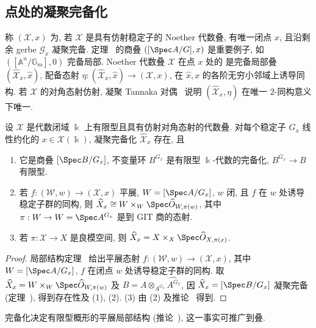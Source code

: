 \subsection{点处的凝聚完备化}\label{src:7.7.6-subsection}
称 $(\mathcal X,x)$ 为, 若 $\mathcal X$ 是具有仿射稳定子的 Noether 代数叠, 有唯一闭点 $x$, 且沿剩余 gerbe $\mathcal G_x$ 凝聚完备. 定理~ 的商叠 $([\Spec A/G],x)$ 是重要例子, 如 $([\mathbb A^n/\mathbb G_m],0)$ 完备局部. Noether 代数叠 $\mathcal X$ 在点 $x$ 处的 是完备局部叠 $(\widehat{\mathcal X}_x,\widehat x)$, 配备态射 $\eta:(\widehat{\mathcal X}_x,\widehat x)\to(\mathcal X,x)$, 在 $\widehat x,x$ 的各阶无穷小邻域上诱导同构. 若 $\mathcal X$ 的对角态射仿射, 凝聚 Tannaka 对偶~ 说明 $(\widehat{\mathcal X}_x,\eta)$ 在唯一 $2$-同构意义下唯一.
\begin{theorem}\label{src:7.7.22}
设 $\mathcal X$ 是代数闭域 $\Bbbk$ 上有限型且具有仿射对角态射的代数叠. 对每个稳定子 $G_x$ 线性约化的 $x\in\mathcal X(\Bbbk)$, 凝聚完备化 $\widehat{\mathcal X}_x$ 存在, 且
\begin{enumerate}[(1)]
\item 它是商叠 $[\Spec B/G_x]$, 不变量环 $B^{G_x}$ 是有限型 $\Bbbk$-代数的完备化, $B^{G_x}\to B$ 有限型.
\item 若 $f:(\mathcal W,w)\to(\mathcal X,x)$ 平展, $\mathcal W=[\Spec A/G_x]$, $w$ 闭, 且 $f$ 在 $w$ 处诱导稳定子群的同构, 则 $\widehat{\mathcal X}_x\cong\mathcal W\times_W\Spec\widehat{\mathcal O}_{W,\pi(w)}$, 其中 $\pi:\mathcal W\to W=\Spec A^{G_x}$ 是到 GIT 商的态射.
\item 若 $\pi:\mathcal X\to X$ 是良模空间, 则 $\widehat{\mathcal X}_x=\mathcal X\times_X\Spec\widehat{\mathcal O}_{X,\pi(x)}$.
\end{enumerate}
\end{theorem}
\begin{proof}
局部结构定理~ 给出平展态射 $f:(\mathcal W,w)\to(\mathcal X,x)$, 其中 $\mathcal W=[\Spec A/G_x]$, $f$ 在闭点 $w$ 处诱导稳定子群的同构. 取 $\widehat{\mathcal X}_x=\mathcal W\times_W\Spec\widehat{\mathcal O}_{W,\pi(w)}$ 及 $B=A\otimes_{A^{G_x}}\widehat{A^{G_x}}$, 因 $\widehat{\mathcal X}_x=[\Spec B/G_x]$ 凝聚完备 (定理~), 得到存在性及 (1), (2). (3) 由 (2) 及推论~ 得到.
\end{proof}
完备化决定有限型概形的平展局部结构 (推论~), 这一事实可推广到叠.
